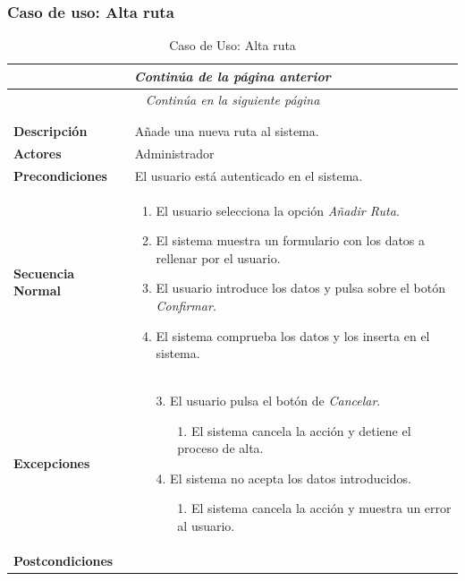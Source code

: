 \subsubsection*{Caso de uso: Alta ruta }
\begin{longtable}{| p{4cm} | p{10cm} |}
\endfirsthead
\multicolumn{2}{c}{\textit{Continúa de la página anterior}}\\[12pt]
\hline
\endhead
\hline
\multicolumn{2}{c}{\textit{Continúa en la siguiente página}} \\
\endfoot
\hline
\caption{Caso de Uso: Alta ruta}\label{fig:1}\\
\endlastfoot


\hline
\multicolumn{2}{|c|}{\textbf{CU$<$27$>$ - Alta Ruta}} \\

\hline
\textbf{Descripción} &
Añade una nueva ruta al sistema.\\

\hline
\textbf{Actores} &
Administrador\\

\hline
\textbf{Precondiciones} &
El usuario está autenticado en el sistema.\\

\hline
\textbf{Secuencia Normal} &\mbox{}\par\vspace{-\baselineskip}
\begin{enumerate}[leftmargin=0.7cm, topsep=0.1cm]
\item El usuario selecciona la opción \textit{Añadir Ruta}.
\item El sistema muestra un formulario con los datos a rellenar por el usuario.
\item El usuario introduce los datos y pulsa sobre el botón \textit{Confirmar}.
\item El sistema comprueba los datos y los inserta en el sistema.
\end{enumerate}


\\
\hline
\textbf{Excepciones} &\mbox{}\par\vspace{-\baselineskip}
\begin{enumerate}[leftmargin=0.9cm, topsep=0.1cm]
\item[3.] El usuario pulsa el botón de \textit{Cancelar}.
	\begin{itemize}
	\item[1.] El sistema cancela la acción y detiene el proceso de alta.
	\end{itemize}
\item[4.] El sistema no acepta los datos introducidos.
	\begin{itemize}
	\item[1.] El sistema cancela la acción y muestra un error al usuario.
	\end{itemize}
\end{enumerate}
\\

\hline
\textbf{Postcondiciones} & \\
\hline
\end{longtable}



